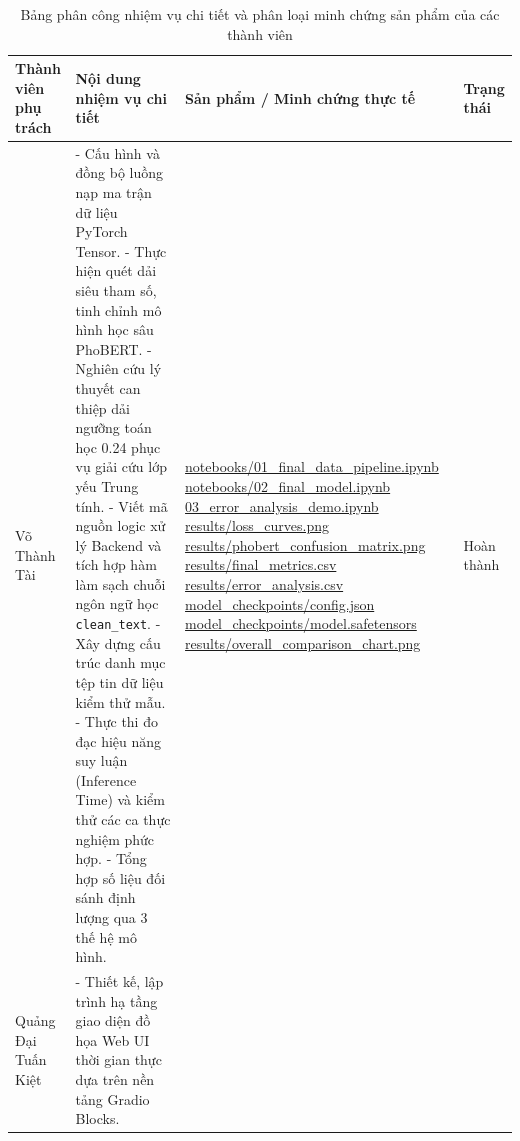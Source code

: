 \documentclass[conference,10pt,a4paper]{IEEEtran}
\begin{document}
\begin{table}[t]
\centering
\caption{Bảng phân công nhiệm vụ chi tiết và phân loại minh chứng sản phẩm của các thành viên}
\vspace{0.15cm}
\small
\renewcommand{\arraystretch}{1.3}
\begin{tabularx}{\textwidth}{|>{\centering\arraybackslash}p{2.5cm}|X|X|>{\centering\arraybackslash}p{1.8cm}|}
\hline
\textbf{Thành viên phụ trách} & \textbf{Nội dung nhiệm vụ chi tiết} & \textbf{Sản phẩm / Minh chứng thực tế} & \textbf{Trạng thái} \\
\hline
Võ Thành Tài & 
- Cấu hình và đồng bộ luồng nạp ma trận dữ liệu PyTorch Tensor. \newline
- Thực hiện quét dải siêu tham số, tinh chỉnh mô hình học sâu PhoBERT. \newline
- Nghiên cứu lý thuyết can thiệp dải ngưỡng toán học 0.24 phục vụ giải cứu lớp yếu Trung tính. \newline
- Viết mã nguồn logic xử lý Backend và tích hợp hàm làm sạch chuỗi ngôn ngữ học \texttt{clean\_text}. \newline
- Xây dựng cấu trúc danh mục tệp tin dữ liệu kiểm thử mẫu. \newline
- Thực thi đo đạc hiệu năng suy luận (Inference Time) và kiểm thử các ca thực nghiệm phức hợp. \newline
- Tổng hợp số liệu đối sánh định lượng qua 3 thế hệ mô hình. & 
\url{notebooks/01_final_data_pipeline.ipynb} \newline
\url{notebooks/02_final_model.ipynb} \newline
\url{03_error_analysis_demo.ipynb} \newline
\url{results/loss_curves.png} \newline
\url{results/phobert_confusion_matrix.png} \newline
\url{results/final_metrics.csv} \newline
\url{results/error_analysis.csv} \newline
\url{model_checkpoints/config.json} \newline
\url{model_checkpoints/model.safetensors} \newline
\url{results/overall_comparison_chart.png} & 
Hoàn thành \\
\hline
Quảng Đại Tuấn Kiệt & 
- Thiết kế, lập trình hạ tầng giao diện đồ họa Web UI thời gian thực dựa trên nền tảng Gradio Blocks. \newline

\end{tabularx}
\end{table}
\end{document}

